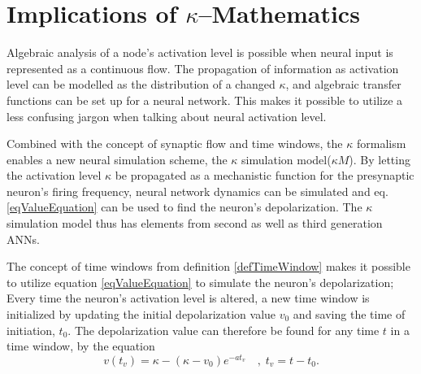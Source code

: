 
	\section{Implications of $\kappa$--Mathematics}
		Algebraic analysis of a node's activation level is possible when neural input is represented as a continuous flow.
		The propagation of information as activation level can be modelled as the distribution of a changed $\kappa$, 
			and algebraic transfer functions can be set up for a neural network.
		This makes it possible to utilize a less confusing jargon when talking about neural activation level.

		Combined with the concept of synaptic flow and time windows, the $\kappa$ formalism enables a new neural simulation scheme, the $\kappa$ simulation model($\kappa M$).
		By letting the activation level $\kappa$ be propagated as a mechanistic function for the presynaptic neuron's firing frequency,
			neural network dynamics can be simulated and eq. \ref{eqValueEquation} can be used to find the neuron's depolarization.
		The $\kappa$ simulation model thus has elements from second as well as third generation ANNs.

		The concept of time windows from definition \ref{defTimeWindow} makes it possible to utilize equation \ref{eqValueEquation}
			to simulate the neuron's depolarization;
		Every time the neuron's activation level is altered, a new time window is initialized by updating the initial depolarization 
			value $v_0$ and saving the time of initiation, $t_0$.
		The depolarization value can therefore be found for any time $t$ in a time window, by the equation
$$v(t_v) = \kappa - \left( \kappa - v_0 \right) e^{-at_v} 	\quad,\; t_v = t - t_0 . $$

